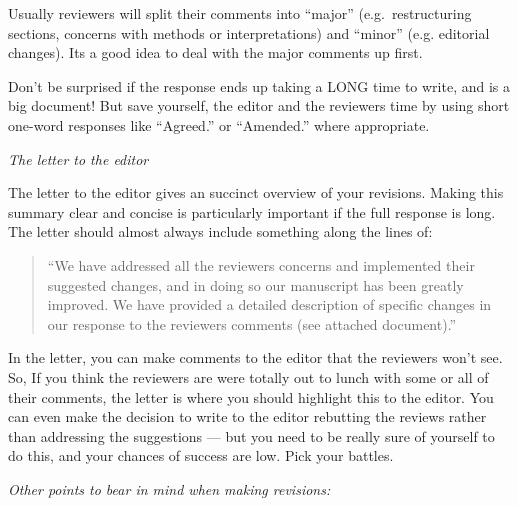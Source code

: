 \documentclass[11pt,]{article}
\begin{document}
Usually reviewers will split their comments into ``major''
(e.g.~restructuring sections, concerns with methods or interpretations)
and ``minor'' (e.g. editorial changes). Its a good idea to deal with the
major comments up first.

Don't be surprised if the response ends up taking a LONG time to write,
and is a big document! But save yourself, the editor and the reviewers
time by using short one-word responses like ``Agreed.'' or ``Amended.''
where appropriate.

\bigskip{}

\emph{The letter to the editor}

The letter to the editor gives an succinct overview of your revisions.
Making this summary clear and concise is particularly important if the
full response is long. The letter should almost always include something
along the lines of:

\begin{quote}
``We have addressed all the reviewers concerns and implemented their
suggested changes, and in doing so our manuscript has been greatly
improved. We have provided a detailed description of specific changes in
our response to the reviewers comments (see attached document).''
\end{quote}

In the letter, you can make comments to the editor that the reviewers
won't see. So, If you think the reviewers are were totally out to lunch
with some or all of their comments, the letter is where you should
highlight this to the editor. You can even make the decision to write to
the editor rebutting the reviews rather than addressing the suggestions
--- but you need to be really sure of yourself to do this, and your
chances of success are low. Pick your battles. \bigskip{}

\emph{Other points to bear in mind when making revisions:}
\end{document}
